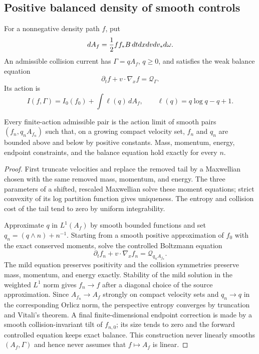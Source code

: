 \subsection{Positive balanced density of smooth controls}

For a nonnegative density path $f$, put
\[
 dA_f={1\over2}ff_*B\,dtdxdvdv_*d\omega.
\]
An admissible collision current has $\Gamma=qA_f$, $q\ge0$, and satisfies the
weak balance equation
\[
 \partial_tf+v\cdot\nabla_xf=\mathcal Q_\Gamma.
\]
Its action is
\[
 I(f,\Gamma)=I_0(f_0)+\int\ell(q)\,dA_f,
 \qquad \ell(q)=q\log q-q+1.
\]

\begin{theorem}
\label{thm:r21-b2-recovery}
Every finite-action admissible pair is the action limit of smooth pairs
$(f_n,q_nA_{f_n})$ such that, on a growing compact velocity set,
$f_n$ and $q_n$ are bounded above and below by positive constants.  Mass,
momentum, energy, endpoint constraints, and the balance equation hold exactly
for every $n$.
\end{theorem}

\begin{proof}
First truncate velocities and replace the removed tail by a Maxwellian chosen
with the same removed mass, momentum, and energy.  The three parameters of a
shifted, rescaled Maxwellian solve these moment equations; strict convexity of
its log partition function gives uniqueness.  The entropy and collision cost
of the tail tend to zero by uniform integrability.

Approximate $q$ in $L^1(A_f)$ by smooth bounded functions and set
$q_n=(q\wedge n)+n^{-1}$.  Starting from a smooth positive approximation of
$f_0$ with the exact conserved moments, solve the controlled Boltzmann equation
\[
 \partial_tf_n+v\cdot\nabla_xf_n=\mathcal Q_{q_nA_{f_n}}.
\]
The mild equation preserves positivity and the collision symmetries preserve
mass, momentum, and energy exactly.  Stability of the mild solution in the
weighted $L^1$ norm gives $f_n\to f$ after a diagonal choice of the source
approximation.  Since $A_{f_n}\to A_f$ strongly on compact velocity sets and
$q_n\to q$ in the corresponding Orlicz norm, the perspective entropy
converges by truncation and Vitali's theorem.  A final finite-dimensional
endpoint correction is made by a smooth collision-invariant tilt of $f_{n,0}$;
its size tends to zero and the forward controlled equation keeps exact
balance.  This construction never linearly smooths $(A_f,\Gamma)$ and hence
never assumes that $f\mapsto A_f$ is linear.
\end{proof}

